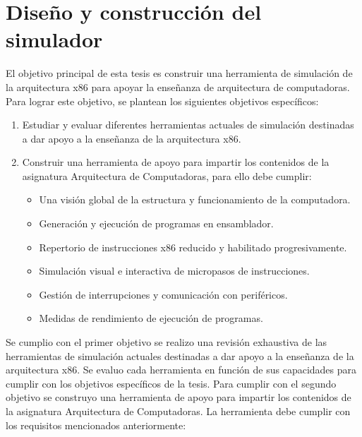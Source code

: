 \documentclass[12pt,twoside]{templates/unerthesis}
\providecommand{\tightlist}{%
  \setlength{\itemsep}{0pt}\setlength{\parskip}{0pt}}
\begin{document}
\hypertarget{diseuxf1o-y-construcciuxf3n-del-simulador}{%
\chapter{Diseño y construcción del simulador}\label{diseuxf1o-y-construcciuxf3n-del-simulador}}

El objetivo principal de esta tesis es construir una herramienta de simulación de la arquitectura x86 para apoyar la enseñanza de arquitectura de computadoras. Para lograr este objetivo, se plantean los siguientes objetivos específicos:

\begin{enumerate}
\def\labelenumi{\arabic{enumi}.}
\tightlist
\item
  Estudiar y evaluar diferentes herramientas actuales de simulación destinadas a dar apoyo a la enseñanza de la arquitectura x86.
\item
  Construir una herramienta de apoyo para impartir los contenidos de la asignatura Arquitectura de Computadoras, para ello debe cumplir:

  \begin{itemize}
  \tightlist
  \item
    Una visión global de la estructura y funcionamiento de la computadora.
  \item
    Generación y ejecución de programas en ensamblador.
  \item
    Repertorio de instrucciones x86 reducido y habilitado progresivamente.
  \item
    Simulación visual e interactiva de micropasos de instrucciones.
  \item
    Gestión de interrupciones y comunicación con periféricos.
  \item
    Medidas de rendimiento de ejecución de programas.
  \end{itemize}
\end{enumerate}

Se cumplio con el primer objetivo se realizo una revisión exhaustiva de las herramientas de simulación actuales destinadas a dar apoyo a la enseñanza de la arquitectura x86. Se evaluo cada herramienta en función de sus capacidades para cumplir con los objetivos específicos de la tesis.
Para cumplir con el segundo objetivo se construyo una herramienta de apoyo para impartir los contenidos de la asignatura Arquitectura de Computadoras. La herramienta debe cumplir con los requisitos mencionados anteriormente:
\end{document}
